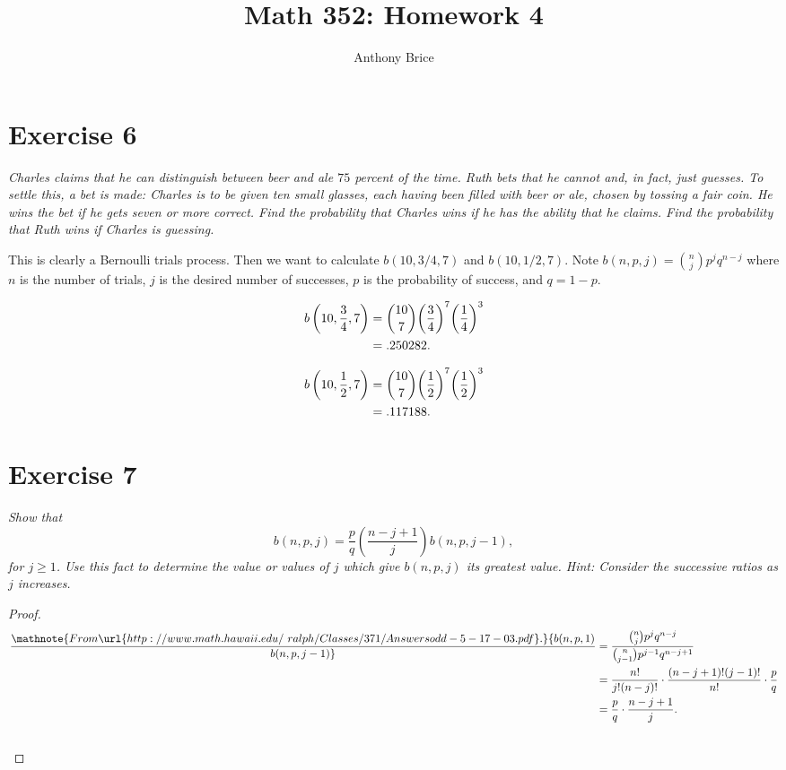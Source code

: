 \documentclass{abrice}
\title{Math 352: Homework 4}
\author{Anthony Brice}
\begin{document}
\maketitle

\section{Exercise 6}

\emph{Charles claims that he can distinguish between beer and ale $75$
  percent of the time.  Ruth bets that he cannot and, in fact, just
  guesses.  To settle this, a bet is made: Charles is to be given ten
  small glasses, each having been filled with beer or ale, chosen by
  tossing a fair coin.  He wins the bet if he gets seven or more
  correct.  Find the probability that Charles wins if he has the
  ability that he claims.  Find the probability that Ruth wins if
  Charles is guessing.}

\bigskip

This is clearly a Bernoulli trials process. Then we want to calculate
$b(10,3/4,7)$ and $b(10,1/2,7)$. Note
$ b(n,p,j) = {n \choose j} p^j q^{n - j}$ where $n$ is the number of
trials, $j$ is the desired number of successes, $p$ is the probability
of success, and $q = 1 - p$.

\begin{align*}
  b\left(10,{3 \over 4},7\right)
  &= {10 \choose 7} {\left( 3 \over 4 \right)}^7 {\left( 1 \over 4
    \right)}^3\\
  &= .250282.
\end{align*}

\begin{align*}
  b \left(10, {1 \over 2}, 7 \right)
  &= {10 \choose 7} {\left( 1 \over 2 \right)}^7 {\left( 1 \over 2
    \right)}^3\\
  &= .117188.
\end{align*}

\section{Exercise 7}

\emph{Show that
  \[
  b(n,p,j) = \frac pq \left(\frac {n - j + 1}j \right) b(n,p,j - 1),
  \]
  for $j \ge 1$. Use this fact to determine the value or values of
  $j$ which give $b(n,p,j)$ its greatest value.  \emph{Hint:} Consider
  the successive ratios as $j$ increases.}

\bigskip

\begin{proof}
  \begin{align*}\mathnote{From \url{http://www.math.hawaii.edu/~ralph/Classes/371/Answersodd-5-17-03.pdf}.}
    {b(n,p,1) \over b(n,p,j-1)}
    &= { {n \choose j} p^j q^{n-j} \over {n \choose j -1} p^{j - 1}
      q^{n - j + 1}}\\
    &= {n! \over j!(n-j)!} \cdot {(n-j + 1)! (j - 1)! \over n!}
      \cdot {p\over q}\\
    &= {p \over q} \cdot {n - j + 1 \over j}.\\
    & \qedhere
  \end{align*}
\end{proof}
\end{document}
